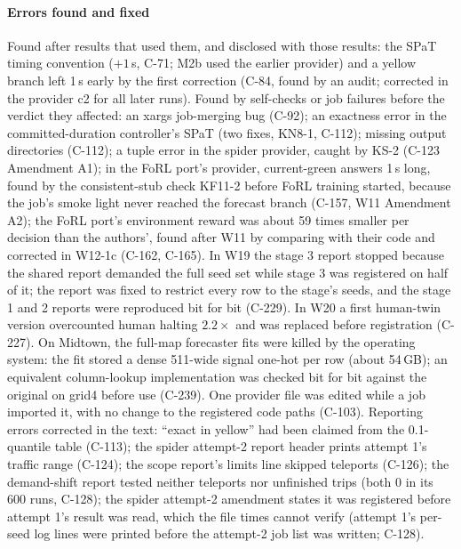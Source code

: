 \paragraph{Errors found and fixed} Found after results that used them, and disclosed with those results: the SPaT timing convention
($+1$\,s, C-71; M2b used the earlier provider) and a yellow branch left 1\,s early by the first correction (C-84, found by an audit;
corrected in the provider c2 for all later runs). Found by self-checks or job failures before the verdict they affected: an xargs job-merging bug (C-92); an exactness error in the committed-duration controller's SPaT (two fixes, KN8-1, C-112);
missing output directories (C-112); a tuple error in the spider provider, caught by KS-2 (C-123 Amendment A1); in the FoRL port's provider, current-green answers 1\,s long, found by the consistent-stub check KF11-2 before FoRL training started, because the job's smoke light never reached the forecast branch (C-157, W11 Amendment A2); the FoRL port's environment reward was
about 59 times smaller per decision than the authors', found after W11 by comparing with their code and corrected in W12-1c (C-162,
C-165). In W19 the stage 3 report stopped because the shared report demanded the full seed set while stage 3 was registered on half of it;
the report was fixed to restrict every row to the stage's seeds, and the stage 1 and 2 reports were reproduced bit for bit (C-229). In W20
a first human-twin version overcounted human halting $2.2\times$ and was replaced before registration (C-227). On Midtown, the full-map
forecaster fits were killed by the operating system: the fit stored a dense 511-wide signal one-hot per row (about 54\,GB); an equivalent
column-lookup implementation was checked bit for bit against the original on grid4 before use (C-239). One provider file was edited
while a job imported it, with no change to the registered code paths (C-103).
Reporting errors corrected in the text: ``exact in yellow'' had been claimed from the 0.1-quantile table (C-113); the spider attempt-2
report header prints attempt 1's traffic range (C-124); the scope report's limits line skipped teleports (C-126); the demand-shift report tested neither teleports nor unfinished trips (both 0
in its 600 runs, C-128); the spider attempt-2 amendment states it was registered before attempt 1's result was read, which the file
times cannot verify (attempt 1's per-seed log lines were printed before the attempt-2 job list was written; C-128).

